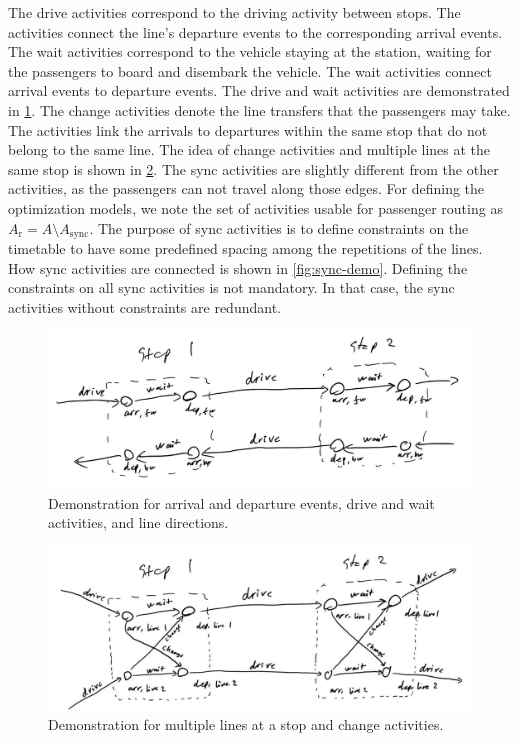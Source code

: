 \documentclass[english, 12pt, a4paper, sci, utf8, a-2b, online]{aaltothesis}
\newcommand{\Async}{A_\text{sync}}
\newcommand{\Ar}{A_\text{r}}
\begin{document}
The drive activities correspond to the driving activity between stops. The activities connect the line's departure events to the corresponding arrival events. The wait activities correspond to the vehicle staying at the station, waiting for the passengers to board and disembark the vehicle. The wait activities connect arrival events to departure events. The drive and wait activities are demonstrated in \cref{fig:drive-wait-demo}. The change activities denote the line transfers that the passengers may take. The activities link the arrivals to departures within the same stop that do not belong to the same line. The idea of change activities and multiple lines at the same stop is shown in \cref{fig:change-demo}. The sync activities are slightly different from the other activities, as the passengers can not travel along those edges. For defining the optimization models, we note the set of activities usable for passenger routing as $\Ar = A \setminus \Async$. The purpose of sync activities is to define constraints on the timetable to have some predefined spacing among the repetitions of the lines. How sync activities are connected is shown in \cref{fig:sync-demo}. Defining the constraints on all sync activities is not mandatory. In that case, the sync activities without constraints are redundant.


\begin{figure}
    \centering
    \includegraphics[width=1.0\textwidth]{figures/drive-wait-demo.jpg}
    \caption{Demonstration for arrival and departure events, drive and wait activities, and line directions.}
    \label{fig:drive-wait-demo}
\end{figure}

\begin{figure}
    \centering
    \includegraphics[width=1.0\textwidth]{figures/change-demo.jpg}
    \caption{Demonstration for multiple lines at a stop and change activities.}
    \label{fig:change-demo}
\end{figure}
\end{document}

